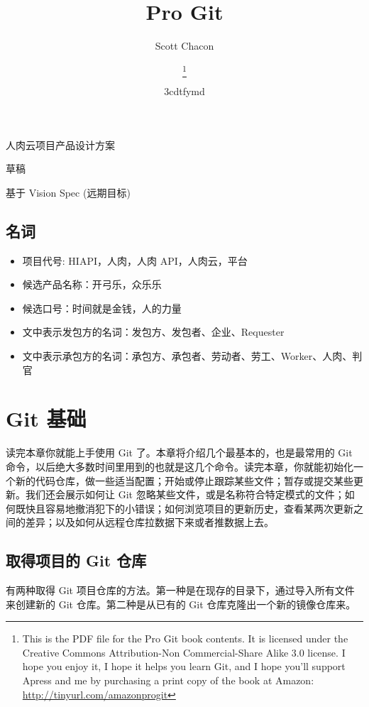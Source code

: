 \documentclass[a4paper]{book}
\title{Pro Git}
\author{Scott Chacon}
\title{\textbf{\savedtitle}}
\author{\textbf{\savedauthor}\thanks{This is the PDF file for the Pro Git book contents. It is licensed under the Creative Commons Attribution-Non Commercial-Share Alike 3.0 license. I hope you enjoy it, I hope it helps you learn Git, and I hope you'll support Apress and me by purchasing a print copy of the book at Amazon: \url{http://tinyurl.com/amazonprogit}}}
\date{\w3cdtfymd}
\makeatletter
\let\savedauthor=\@author
\let\savedtitle=\@title
\newcounter{tab}[chapter]
\newcommand{\chap}[1]{\newpage\thispagestyle{empty}\chapter{#1}\label{chap:\thechapter}}
\makeatother
\begin{document}
\frontmatter
\maketitle
\thispagestyle{empty}
\setcounter{tocdepth}{4}
\tableofcontents\newpage\thispagestyle{empty}

\mainmatter
\fancyhf{}
\fancyhead[LE]{{\small\leftmark}}
\fancyhead[RO]{{\small\rightmark}}
\fancyhead[RE,LO]{{\small\savedauthor\hspace*{1ex}\textbf{\savedtitle}}}
\fancyfoot[LE,RO]{\small\textbf\thepage}
\pagestyle{fancy}

人肉云项目产品设计方案

草稿

基于 Vision Spec (远期目标)

\section{名词}

\begin{itemize}
\itemsep1pt\parskip0pt
\item
  项目代号: HIAPI，人肉，人肉 API，人肉云，平台
\item
  候选产品名称：开弓乐，众乐乐
\item
  候选口号：时间就是金钱，人的力量
\item
  文中表示发包方的名词：发包方、发包者、企业、Requester
\item
  文中表示承包方的名词：承包方、承包者、劳动者、劳工、Worker、人肉、判官
\end{itemize}

\chap{Git 基础}

读完本章你就能上手使用 Git 了。本章将介绍几个最基本的，也是最常用的 Git 命令，以后绝大多数时间里用到的也就是这几个命令。读完本章，你就能初始化一个新的代码仓库，做一些适当配置；开始或停止跟踪某些文件；暂存或提交某些更新。我们还会展示如何让 Git 忽略某些文件，或是名称符合特定模式的文件；如何既快且容易地撤消犯下的小错误；如何浏览项目的更新历史，查看某两次更新之间的差异；以及如何从远程仓库拉数据下来或者推数据上去。

\section{取得项目的 Git 仓库}

有两种取得 Git 项目仓库的方法。第一种是在现存的目录下，通过导入所有文件来创建新的 Git 仓库。第二种是从已有的 Git 仓库克隆出一个新的镜像仓库来。
\end{document}
